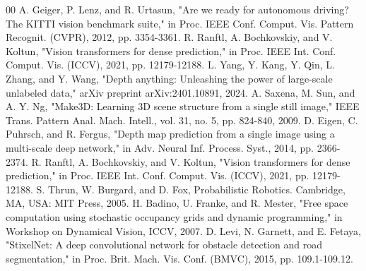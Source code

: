\documentclass[conference]{IEEEtran}
\begin{document}
\begin{thebibliography}{00}
 A. Geiger, P. Lenz, and R. Urtasun, "Are we ready for autonomous driving? The KITTI vision benchmark suite," in Proc. IEEE Conf. Comput. Vis. Pattern Recognit. (CVPR), 2012, pp. 3354-3361.
 R. Ranftl, A. Bochkovskiy, and V. Koltun, "Vision transformers for dense prediction," in Proc. IEEE Int. Conf. Comput. Vis. (ICCV), 2021, pp. 12179-12188.
 L. Yang, Y. Kang, Y. Qin, L. Zhang, and Y. Wang, "Depth anything: Unleashing the power of large-scale unlabeled data," arXiv preprint arXiv:2401.10891, 2024.
 A. Saxena, M. Sun, and A. Y. Ng, "Make3D: Learning 3D scene structure from a single still image," IEEE Trans. Pattern Anal. Mach. Intell., vol. 31, no. 5, pp. 824-840, 2009.
 D. Eigen, C. Puhrsch, and R. Fergus, "Depth map prediction from a single image using a multi-scale deep network," in Adv. Neural Inf. Process. Syst., 2014, pp. 2366-2374.
 R. Ranftl, A. Bochkovskiy, and V. Koltun, "Vision transformers for dense prediction," in Proc. IEEE Int. Conf. Comput. Vis. (ICCV), 2021, pp. 12179-12188.
 S. Thrun, W. Burgard, and D. Fox, Probabilistic Robotics. Cambridge, MA, USA: MIT Press, 2005.
 H. Badino, U. Franke, and R. Mester, "Free space computation using stochastic occupancy grids and dynamic programming," in Workshop on Dynamical Vision, ICCV, 2007.
 D. Levi, N. Garnett, and E. Fetaya, "StixelNet: A deep convolutional network for obstacle detection and road segmentation," in Proc. Brit. Mach. Vis. Conf. (BMVC), 2015, pp. 109.1-109.12.
\end{thebibliography}
\end{document}
